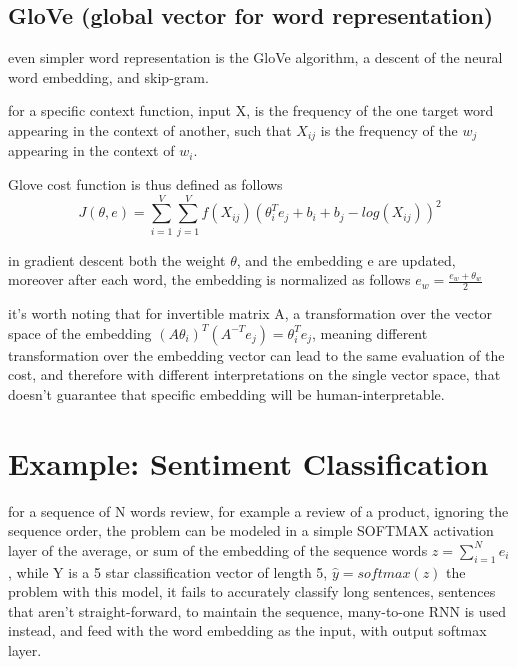 \documentclass[4apaper,12pt]{book}
\begin{document}
\begin{description}
\begin{description}
\begin{description}
            \subsection{GloVe (global vector for word representation)}
            \begin{description}
            \item even simpler word representation is the GloVe algorithm, a descent of the neural word embedding, and skip-gram.
            \item for a specific context function, input X, is the frequency of the one target word appearing in the context of another, such that $X_{ij}$ is the frequency of the $w_j$ appearing in the context of $w_i$.
            \item Glove cost function is thus defined as follows $$ J(\theta, e) = \sum_{i=1}^V\sum_{j=1}^Vf(X_{ij})(\theta_i^Te_j + b_i + b_j - log(X_{ij}))^2 $$
            \item in gradient descent both the weight $\theta$, and the embedding e are updated, moreover after each word, the embedding is normalized as follows $e_w=\frac{e_w+\theta_w}{2}$
            \item it's worth noting that for invertible matrix A, a transformation over the vector space of the embedding $(A\theta_i)^T(A^{-T}e_j)=\theta_i^Te_j$, meaning different transformation over the embedding vector can lead to the same evaluation of the cost, and therefore with different interpretations on the single vector space, that doesn't guarantee that specific embedding will be human-interpretable.
            \end{description}
        \end{description}
    \end{description}
    \section{Example: Sentiment Classification}
    \begin{description}
    \item for a sequence of N words review, for example a review of a product, ignoring the sequence order, the problem can be modeled in a simple SOFTMAX activation layer of the average, or sum of the embedding of the sequence words $ z = \sum_{i=1}^Ne_i $, while Y is a 5 star classification vector of length 5, $\hat{y} = softmax(z)$ the problem with this model, it fails to accurately classify long sentences, sentences that aren't straight-forward, to maintain the sequence, many-to-one RNN is used instead, and feed with the word embedding as the input,  with output softmax layer.
    \end{description}
  \end{description}
\end{document}
